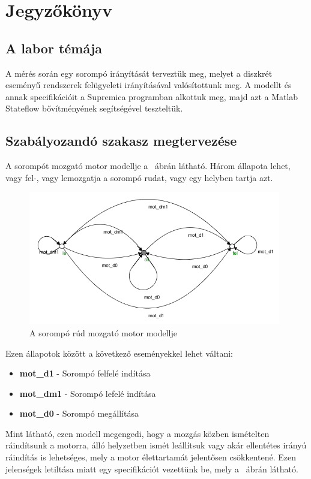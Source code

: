 \chapter{Jegyzőkönyv}





\section{A labor témája}
A mérés során egy sorompó irányítását terveztük meg, melyet a diszkrét eseményű rendszerek felügyeleti irányításával valósítottunk meg. A modellt és annak specifikációit a Supremica programban alkottuk meg, majd azt a Matlab Stateflow bővítményének segítségével teszteltük.


\section{Szabályozandó szakasz megtervezése}
A sorompót mozgató motor modellje a ~ábrán látható. Három állapota lehet, vagy fel-, vagy lemozgatja a sorompó rudat, vagy egy helyben tartja azt. 

\begin{figure}
	\centering
	\includegraphics[width=110mm,keepaspectratio]{figures/2m03/b_motor.png}
	\caption{A sorompó rúd mozgató motor modellje}
	\label{fig:Motor}
\end{figure}
Ezen állapotok között a következő eseményekkel lehet váltani:
\begin{itemize}
	\item \textbf{mot\_d1} - Sorompó felfelé indítása
	\item \textbf{mot\_dm1} - Sorompó lefelé indítása
	\item \textbf{mot\_d0} - Sorompó megállítása
\end{itemize}
Mint látható, ezen modell megengedi, hogy a mozgás közben ismételten ráindítsunk a motorra, álló helyzetben ismét leállítsuk vagy akár ellentétes irányú ráindítás is lehetséges, mely a motor élettartamát jelentősen csökkentené. Ezen jelenségek letiltása miatt egy specifikációt vezettünk be, mely a ~ábrán látható.

